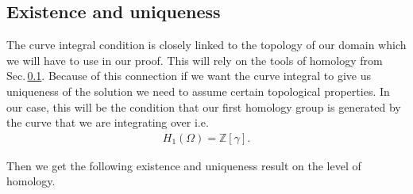 \documentclass[12pt,a4paper]{article}
\numberwithin{equation}{subsection}
\numberwithin{lemma}{subsection}
\theoremstyle{definition}
\newcommand{\integers}{\mathbb{Z}}
\begin{document}
\subsection{Existence and uniqueness}

The curve integral condition is closely linked to the topology of our domain 
which we will have to use in our proof.
This will rely on the tools of homology from Sec.\,\ref{}. 
Because of this connection if we want the curve integral
to give us uniqueness of the solution we need to assume certain topological 
properties. In our case, this will be the condition that our first 
homology group is generated by the curve that we are integrating over i.e.
\begin{align*}
    H_1(\Omega) = \integers [\gamma].
\end{align*}

Then we get the following existence and uniqueness result on the 
level of homology.
\end{document}
